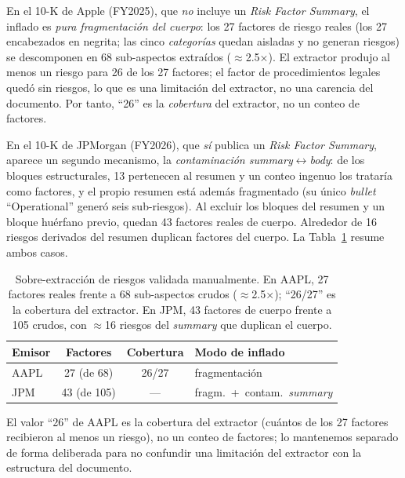 \documentclass[conference]{IEEEtran}
\begin{document}
En el 10-K de Apple (FY2025), que \emph{no} incluye un \textit{Risk Factor
Summary}, el inflado es \emph{pura fragmentación del cuerpo}: los 27 factores de
riesgo reales (los 27 encabezados en negrita; las cinco \emph{categorías} quedan
aisladas y no generan riesgos) se descomponen en 68 sub-aspectos extraídos
($\approx$2.5$\times$). El extractor produjo al menos un riesgo para 26 de los 27
factores; el factor de procedimientos legales quedó sin riesgos, lo que es una
limitación del extractor, no una carencia del documento. Por tanto, ``26'' es la
\emph{cobertura} del extractor, no un conteo de factores.

En el 10-K de JPMorgan (FY2026), que \emph{sí} publica un \textit{Risk Factor
Summary}, aparece un segundo mecanismo, la \emph{contaminación
\textit{summary}$\leftrightarrow$\textit{body}}: de los bloques estructurales, 13
pertenecen al resumen y un conteo ingenuo los trataría como factores, y el propio
resumen está además fragmentado (su único \textit{bullet} ``Operational'' generó
seis sub-riesgos). Al excluir los bloques del resumen y un bloque huérfano previo,
quedan 43 factores reales de cuerpo. Alrededor de 16 riesgos derivados del resumen
duplican factores del cuerpo. La Tabla~\ref{tab:overext} resume ambos casos.

\begin{table}[t]
\centering
\caption{Sobre-extracción de riesgos validada manualmente. En AAPL, 27 factores
reales frente a 68 sub-aspectos crudos ($\approx$2.5$\times$); ``26/27'' es la
cobertura del extractor. En JPM, 43 factores de cuerpo frente a 105 crudos, con
$\approx$16 riesgos del \textit{summary} que duplican el cuerpo.}
\label{tab:overext}
\small
\begin{tabular}{@{}lccp{}@{}}
\toprule
Emisor & Factores & Cobertura & Modo de inflado \\
\midrule
AAPL & 27 (de 68) & 26/27 & fragmentación \\
JPM & 43 (de 105) & --- & fragm.\ +\ contam.\ \textit{summary} \\
\bottomrule
\end{tabular}
\end{table}

El valor ``26'' de AAPL es la cobertura del extractor (cuántos de los 27 factores
recibieron al menos un riesgo), no un conteo de factores; lo mantenemos separado
de forma deliberada para no confundir una limitación del extractor con la
estructura del documento.
\end{document}
